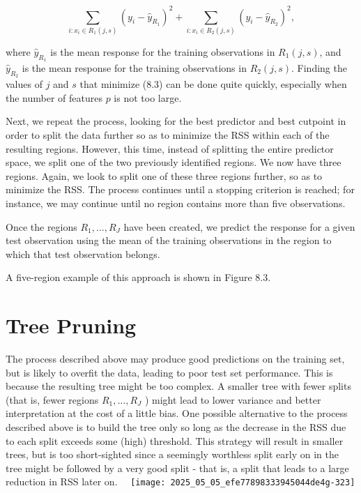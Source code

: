 \documentclass[10pt]{article}
\begin{document}
\begin{equation*}
\sum_{i: x_{i} \in R_{1}(j, s)}\left(y_{i}-\hat{y}_{R_{1}}\right)^{2}+\sum_{i: x_{i} \in R_{2}(j, s)}\left(y_{i}-\hat{y}_{R_{2}}\right)^{2}, \tag{8.3}
\end{equation*}


where $\hat{y}_{R_{1}}$ is the mean response for the training observations in $R_{1}(j, s)$, and $\hat{y}_{R_{2}}$ is the mean response for the training observations in $R_{2}(j, s)$. Finding the values of $j$ and $s$ that minimize (8.3) can be done quite quickly, especially when the number of features $p$ is not too large.

Next, we repeat the process, looking for the best predictor and best cutpoint in order to split the data further so as to minimize the RSS within each of the resulting regions. However, this time, instead of splitting the entire predictor space, we split one of the two previously identified regions. We now have three regions. Again, we look to split one of these three regions further, so as to minimize the RSS. The process continues until a stopping criterion is reached; for instance, we may continue until no region contains more than five observations.

Once the regions $R_{1}, \ldots, R_{J}$ have been created, we predict the response for a given test observation using the mean of the training observations in the region to which that test observation belongs.

A five-region example of this approach is shown in Figure 8.3.

\section*{Tree Pruning}
The process described above may produce good predictions on the training set, but is likely to overfit the data, leading to poor test set performance. This is because the resulting tree might be too complex. A smaller tree with fewer splits (that is, fewer regions $R_{1}, \ldots, R_{J}$ ) might lead to lower variance and better interpretation at the cost of a little bias. One possible alternative to the process described above is to build the tree only so long as the decrease in the RSS due to each split exceeds some (high) threshold. This strategy will result in smaller trees, but is too short-sighted since a seemingly worthless split early on in the tree might be followed by a very good split - that is, a split that leads to a large reduction in RSS later on.\
\
\texttt{[image: 2025\_05\_05\_efe77898333945044de4g-323]}
\end{document}
